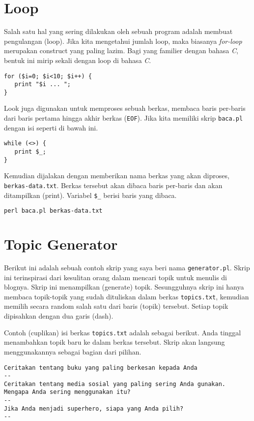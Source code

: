 \section{Loop}
Salah satu hal yang sering dilakukan oleh sebuah program adalah
membuat pengulangan (loop).
Jika kita mengetahui jumlah loop, maka biasanya {\em for-loop}
merupakan construct yang paling lazim.
Bagi yang familier dengan bahasa {\em C}, bentuk ini mirip sekali
dengan loop di bahasa {\em C}.
\begin{lstlisting}
for ($i=0; $i<10; $i++) {
   print "$i ... ";
}
\end{lstlisting}

Look juga digunakan untuk memproses sebuah berkas, membaca baris
per-baris dari baris pertama hingga akhir berkas (\texttt{EOF}).
Jika kita memiliki skrip \texttt{baca.pl} dengan isi seperti
di bawah ini.
\begin{lstlisting}
while (<>) {
   print $_;
}
\end{lstlisting}
Kemudian dijalakan dengan memberikan nama berkas yang akan diproses,
\texttt{berkas-data.txt}. Berkas tersebut akan dibaca baris per-baris
dan akan ditampilkan (print).
Variabel \texttt{\$\_} berisi baris yang dibaca.
\begin{lstlisting}
perl baca.pl berkas-data.txt
\end{lstlisting}

\section{Topic Generator}
Berikut ini adalah sebuah contoh skrip yang saya beri nama
\texttt{generator.pl}.
Skrip ini terinspirasi dari kesulitan orang dalam mencari topik
untuk menulis di blognya. Skrip ini menampilkan (generate) topik.
Sesungguhnya skrip ini hanya membaca topik-topik yang sudah dituliskan
dalam berkas \texttt{topics.txt}, kemudian memilih secara random
salah satu dari baris (topik) tersebut.
Setiap topik dipisahkan dengan dua garis (dash).

Contoh (cuplikan) isi berkas \texttt{topics.txt} adalah 
sebagai berikut. Anda tinggal menambahkan topik baru ke
dalam berkas tersebut. Skrip akan langsung menggunakannya
sebagai bagian dari pilihan.
\begin{lstlisting}
Ceritakan tentang buku yang paling berkesan kepada Anda
--
Ceritakan tentang media sosial yang paling sering Anda gunakan.
Mengapa Anda sering menggunakan itu?
--
Jika Anda menjadi superhero, siapa yang Anda pilih?
--
\end{lstlisting}

